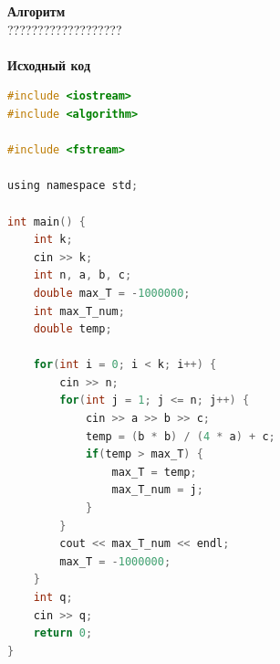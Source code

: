 \documentclass[a4paper,12pt]{article}
\begin{document}
\textbf{{\large Алгоритм}} \\
{\Huge ???????????????????} \\ 
\\
\textbf{{\large Исходный код}}
\begin{lstlisting}[language=C]
#include <iostream>
#include <algorithm>

#include <fstream>

using namespace std;

int main() {
    int k;
    cin >> k;
    int n, a, b, c;
    double max_T = -1000000;
    int max_T_num;
    double temp;

    for(int i = 0; i < k; i++) {
        cin >> n;
        for(int j = 1; j <= n; j++) {
            cin >> a >> b >> c;
            temp = (b * b) / (4 * a) + c;
            if(temp > max_T) {
                max_T = temp;
                max_T_num = j;
            }
        }
        cout << max_T_num << endl;
        max_T = -1000000;
    }
	int q;
	cin >> q;
    return 0;
}
\end{lstlisting}
\end{document}
